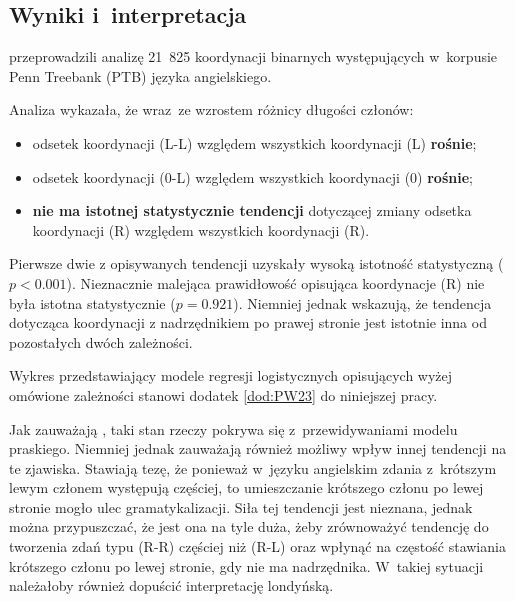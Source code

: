 





\subsection{Wyniki i~interpretacja}

\cite{przepiorkowski2023conjunct} przeprowadzili analizę 21~825 koordynacji binarnych występujących w~korpusie Penn Treebank (PTB) języka angielskiego.

Analiza wykazała, że wraz~ze wzrostem różnicy długości członów:
\begin{itemize}
\item odsetek koordynacji (L-L) względem wszystkich koordynacji (L) \textbf{rośnie};
\item odsetek koordynacji (0-L) względem wszystkich koordynacji (0) \textbf{rośnie};
\item \textbf{nie ma istotnej statystycznie tendencji} dotyczącej zmiany odsetka koordynacji (R) względem wszystkich koordynacji (R).
\end{itemize}

Pierwsze dwie z opisywanych tendencji uzyskały wysoką istotność statystyczną ($p<0.001$). Nieznacznie malejąca prawidłowość opisująca koordynacje (R) nie była istotna statystycznie ($p = 0.921$). Niemniej jednak \cite{przepiorkowski2023conjunct} wskazują, że tendencja dotycząca koordynacji z nadrzędnikiem po prawej stronie jest istotnie inna od pozostałych dwóch zależności. 

Wykres przedstawiający modele regresji logistycznych opisujących wyżej omówione zależności stanowi dodatek \ref{dod:PW23} do niniejszej pracy.

Jak zauważają \cite{przepiorkowski2023conjunct}, taki stan rzeczy pokrywa się z~przewidywaniami modelu praskiego. Niemniej jednak zauważają również możliwy wpływ innej tendencji na te zjawiska. Stawiają tezę, że ponieważ w~języku angielskim zdania z~krótszym lewym członem występują częściej, to umieszczanie krótszego członu po lewej stronie mogło ulec gramatykalizacji. Siła tej tendencji jest nieznana, jednak można przypuszczać, że jest ona na tyle duża, żeby zrównoważyć tendencję do tworzenia zdań typu (R-R) częściej niż (R-L) oraz wpłynąć na częstość stawiania krótszego członu po lewej stronie, gdy nie ma nadrzędnika. W~takiej sytuacji należałoby również dopuścić interpretację londyńską.

